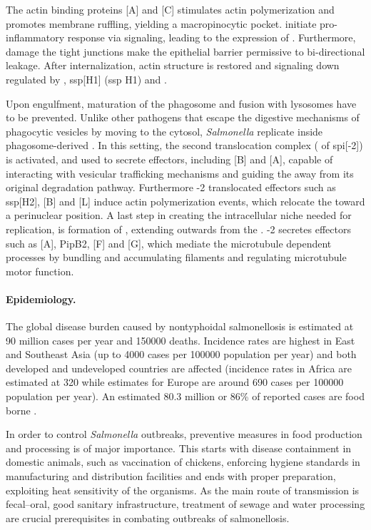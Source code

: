 The actin binding proteins [A] and [C] stimulates actin polymerization and promotes membrane ruffling, yielding a macropinocytic pocket.  initiate pro-inflammatory response via  signaling, leading to the expression of . Furthermore, damage the tight junctions make the epithelial barrier permissive to bi-directional leakage. After internalization, actin structure is restored and  signaling down regulated by , \acrshort{ssp}[H1] (\acrlong{ssp} H1) and .

Upon engulfment, maturation of the phagosome and fusion with lysosomes have to be prevented. Unlike other pathogens that escape the digestive mechanisms of phagocytic vesicles by moving to the cytosol, \textit{Salmonella} replicate inside phagosome-derived . In this setting, the second translocation complex ( of \acrshort{spi}[-2]) is activated, and used to secrete effectors, including [B] and [A], capable of interacting with vesicular trafficking mechanisms and guiding the  away from its original degradation pathway. Furthermore -2 translocated effectors such as \acrshort{ssp}[H2], [B] and [L] induce actin polymerization events, which relocate the  toward a perinuclear position. A last step in creating the intracellular niche needed for replication, is formation of , extending outwards from the . -2 secretes effectors such as [A], PipB2, [F] and [G], which mediate the microtubule dependent processes by bundling and accumulating filaments and regulating microtubule motor function.

\paragraph{Epidemiology.}
The global disease burden caused by nontyphoidal salmonellosis is estimated at 90 million cases per year and 150000 deaths. Incidence rates are highest in East and Southeast Asia (up to 4000 cases per 100000 population per year) and both developed and undeveloped countries are affected (incidence rates in Africa are estimated at 320 while estimates for Europe are around 690 cases per 100000 population per year). An estimated 80.3 million or 86\% of reported cases are food borne \citep{Majowicz2010}.

In order to control \textit{Salmonella} outbreaks, preventive measures in food production and processing is of major importance. This starts with disease containment in domestic animals, such as vaccination of chickens, enforcing  hygiene standards in manufacturing and distribution facilities and ends with proper preparation, exploiting heat sensitivity of the organisms. As the main route of transmission is fecal--oral, good sanitary infrastructure, treatment of sewage and water processing are crucial prerequisites in combating outbreaks of salmonellosis.

